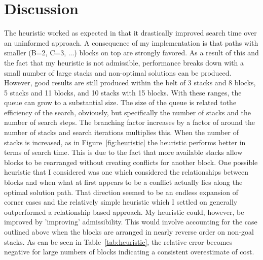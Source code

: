 \documentclass{article}
\begin{document}

\section{Discussion}

The heuristic worked as expected in that it drastically improved search time
over an uninformed approach. A consequence of my implementation is that paths
with smaller (B=2, C=3, ...) blocks on top are strongly favored. As a result of
this and the fact that my heuristic is not admissible, performance breaks down 
with a small number of large stacks and non-optimal solutions can be produced.
However, good results are still produced within the belt of 3 stacks and 8
blocks, 5 stacks and 11 blocks, and 10 stacks with 15 blocks. With these ranges,
the queue can grow to a substantial size. The size of the queue is related tothe
efficiency of the search, obviously, but specifically the number of stacks and
the number of search steps. The branching factor increases by a factor of
around the number of stacks and search iterations multiplies this.
When the number of stacks is increased, as in Figure~\ref{fig:heuristic} the 
heuristic performs better in terms of search time. This is due to the fact that 
more available stacks allow blocks to be rearranged without creating conflicts
for another block. One possible heuristic that I considered was one which
considered the relationships between blocks and when what at first appears to be
a conflict actually lies along the optimal solution path. That direction seemed
to be an endless expansion of corner cases and the relatively simple heuristic
which I settled on generally outperformed a relationship based approach. My
heuristic could, however, be improved by 'improving' admissibility. This would
involve accounting for the case outlined above when the blocks are arranged in
nearly reverse order on non-goal stacks. As can be seen in
Table~\ref{tab:heuristic}, the relative error becomes negative for large numbers
of blocks indicating a consistent overestimate of cost.
\end{document}
